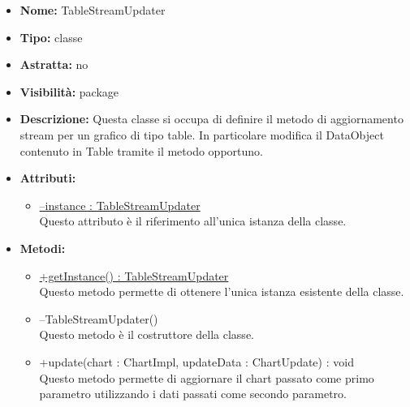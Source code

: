 	
			
			\begin{itemize}
			\item \textbf{Nome:} TableStreamUpdater
			\item \textbf{Tipo:} classe
			
		\item \textbf{Astratta:}
		no
			\item \textbf{Visibilità:} package
			\item \textbf{Descrizione:} Questa classe si occupa di definire il metodo di aggiornamento stream per un grafico di tipo table. In particolare modifica il DataObject contenuto in Table tramite il metodo opportuno.
			\item \textbf{Attributi:}
				\begin{itemize}
				\setlength{\itemsep}{5pt}
				
					\item[\ding{111}] \underline{--instance : TableStreamUpdater} \\ [1mm] Questo attributo è il riferimento all'unica istanza della classe.
				\end{itemize}
		
			\item \textbf{Metodi:}
				\begin{itemize}
				\setlength{\itemsep}{5pt}
				
					\item[\ding{111}] {\underline{+getInstance() : TableStreamUpdater}} \\ [1mm] Questo metodo permette di ottenere l'unica istanza esistente della classe.
					\item[\ding{111}] {{--TableStreamUpdater()}} \\ [1mm] Questo metodo è il costruttore della classe.
					\item[\ding{111}] {{+update(chart : ChartImpl, updateData : ChartUpdate) : void}} \\ [1mm] Questo metodo permette di aggiornare il chart passato come primo parametro utilizzando i dati passati come secondo parametro.
				\end{itemize}
		
			\end{itemize}


